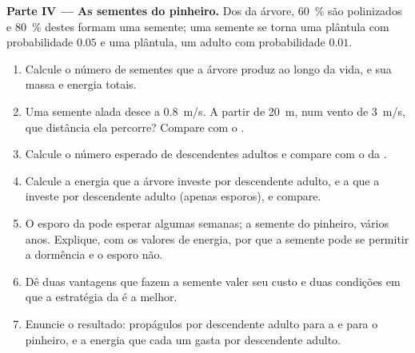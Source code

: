 \begin{problem}
\medskip
\noindent\textbf{Parte IV --- As sementes do pinheiro.}
Dos  da árvore, \qty{60}{\%} são polinizados e \qty{80}{\%}
destes formam uma semente; uma semente se torna uma plântula com
probabilidade $0.05$ e uma plântula, um adulto com probabilidade
$0.01$.
\begin{enumerate}[resume]
  \item Calcule o número de sementes que a árvore produz ao longo da
        vida, e sua massa e energia totais.
  \item Uma semente alada desce a \qty{0.8}{m/s}. A partir de
        \qty{20}{m}, num vento de \qty{3}{m/s}, que distância ela
        percorre? Compare com o .
  \item Calcule o número esperado de descendentes adultos e compare
        com o da .
  \item Calcule a energia que a árvore investe por descendente adulto,
        e a que a  investe por descendente adulto (apenas
        esporos), e compare.
  \item O esporo da  pode esperar algumas semanas; a semente
        do pinheiro, vários anos. Explique, com os valores de energia,
        por que a semente pode se permitir a dormência e o esporo não.
  \item Dê duas vantagens que fazem a semente valer seu custo e duas
        condições em que a estratégia da  é a melhor.
  \item Enuncie o resultado: propágulos por descendente adulto para a
         e para o pinheiro, e a energia que cada um gasta por
        descendente adulto.
\end{enumerate}
\end{problem}
